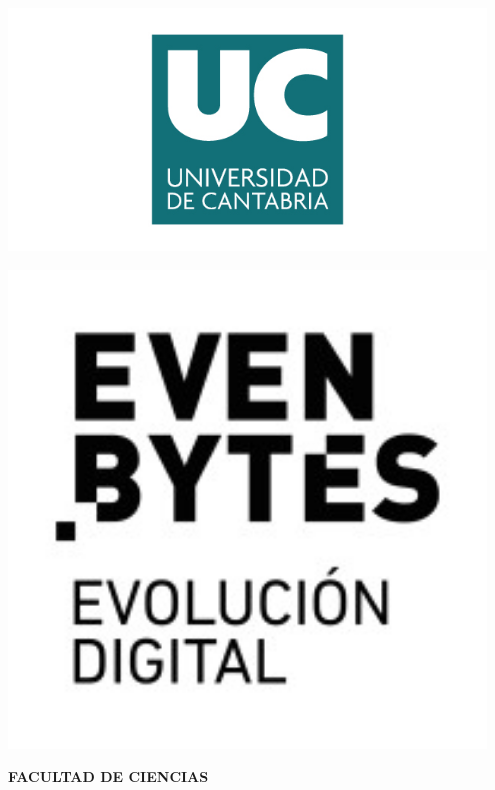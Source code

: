 
\thispagestyle{empty}
\begin{titlepage}
\begin{center}

\begin{minipage}{0.6\textwidth}
\raggedright
\includegraphics[width=0.95\textwidth]{figuras/logo_UC.jpg}
\end{minipage}
\hfill
\begin{minipage}{0.32\textwidth}
\raggedleft
\includegraphics[width=0.95\textwidth]{figuras/logo_Evenbytes.png}
\end{minipage}

\vspace{2cm}

{\Large \textbf{FACULTAD DE CIENCIAS}}

\vspace{1cm}


\end{center}
\end{titlepage}
